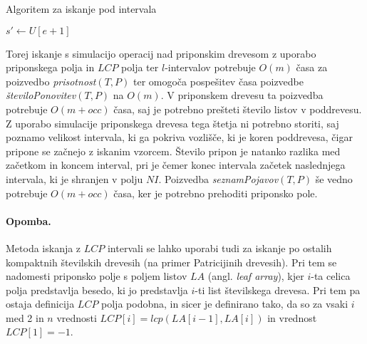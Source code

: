 \begin{algorithm}[htb]

    \caption{Algoritem za iskanje pod intervala }\label{alg:interval}
    {
                    {$s'\leftarrow U[e+1]$}

            {\Vrni{$[s,s'-1]$}}


                {\Vrni{$[s',e]$}}
        
        {\Vrni{$[-1,-1]$}}    
    }
\end{algorithm}


Torej iskanje s simulacijo operacij nad priponskim drevesom z uporabo priponskega polja in $LCP$ polja ter $l$-intervalov potrebuje $O(m)$ časa za poizvedbo \textit{prisotnost}$(T,P)$ ter omogoča pospešitev časa poizvedbe \textit{številoPonovitev}$(T,P)$ na $O(m)$. V priponskem drevesu ta poizvedba potrebuje $O(m+occ)$ časa, saj je potrebno prešteti število listov v poddrevesu. Z uporabo simulacije priponskega drevesa tega štetja ni potrebno storiti, saj poznamo velikost intervala, ki ga pokriva vozlišče, ki je koren poddrevesa, čigar pripone se začnejo z iskanim vzorcem. Število pripon je natanko razlika med začetkom in koncem interval, pri je čemer konec intervala začetek naslednjega intervala, ki je shranjen v polju $NI$. Poizvedba \textit{seznamPojavov}$(T,P)$ še vedno potrebuje $O(m+occ)$ časa, ker je potrebno prehoditi priponsko pole.

\paragraph{Opomba.}
Metoda iskanja z $LCP$ intervali se lahko uporabi tudi za iskanje po ostalih kompaktnih številskih drevesih (na primer Patricijinih drevesih). Pri tem se nadomesti priponsko polje s poljem listov $LA$ (angl. \textit{leaf array}), kjer $i$-ta celica polja predstavlja besedo, ki jo predstavlja $i$-ti list številskega drevesa. Pri tem pa ostaja definicija $LCP$ polja podobna, in sicer je definirano tako, da so za vsaki $i$ med 2 in $n$ vrednosti $LCP[i]=lcp(LA[i-1],LA[i])$ in vrednost $LCP[1]=-1$.
